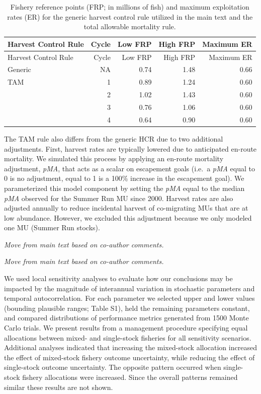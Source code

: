 \documentclass[11pt]{book}
\begin{document}
\begin{longtable}[]{@{}lrrrr@{}}
\caption{\label{tab:frpTable}Fishery reference points (FRP; in millions of fish) and maximum exploitation rates (ER) for the generic harvest control rule utilized in the main text and the total allowable mortality rule.}\tabularnewline
\toprule
Harvest Control Rule & Cycle & Low FRP & High FRP & Maximum ER\tabularnewline
\midrule
\endfirsthead
\toprule
Harvest Control Rule & Cycle & Low FRP & High FRP & Maximum ER\tabularnewline
\midrule
\endhead
Generic & NA & 0.74 & 1.48 & 0.66\tabularnewline
TAM & 1 & 0.89 & 1.24 & 0.60\tabularnewline
& 2 & 1.02 & 1.43 & 0.60\tabularnewline
& 3 & 0.76 & 1.06 & 0.60\tabularnewline
& 4 & 0.64 & 0.90 & 0.60\tabularnewline
\bottomrule
\end{longtable}
The TAM rule also differs from the generic HCR due to two additional adjustments. First, harvest rates are typically lowered due to anticipated en-route mortality. We simulated this process by applying an en-route mortality adjustment, \emph{pMA}, that acts as a scalar on escapement goals (i.e.~a \emph{pMA} equal to 0 is no adjustment, equal to 1 is a 100\% increase in the escapement goal). We parameterized this model component by setting the \emph{pMA} equal to the median \emph{pMA} observed for the Summer Run MU since 2000. Harvest rates are also adjusted annually to reduce incidental harvest of co-migrating MUs that are at low abundance. However, we excluded this adjustment because we only modeled one MU (Summer Run stocks).

\clearpage


\label{app:appendixS2}

\label{multistock-fishery-harvest-control-rule}

\emph{Move from main text based on co-author comments.}

\label{en-route-mortality}

\emph{Move from main text based on co-author comments.}

\label{stochastic-parameter-sensitivity-analyses}

We used local sensitivity analyses to evaluate how our conclusions may be impacted by the magnitude of interannual variation in stochastic parameters and temporal autocorrelation. For each parameter we selected upper and lower values (bounding plausible ranges; Table S1), held the remaining parameters constant, and compared distributions of performance metrics generated from 1500 Monte Carlo trials. We present results from a management procedure specifying equal allocations between mixed- and single-stock fisheries for all sensitivity scenarios. Additional analyses indicated that increasing the mixed-stock allocation increased the effect of mixed-stock fishery outcome uncertainty, while reducing the effect of single-stock outcome uncertainty. The opposite pattern occurred when single-stock fishery allocations were increased. Since the overall patterns remained similar these results are not shown.
\end{document}

